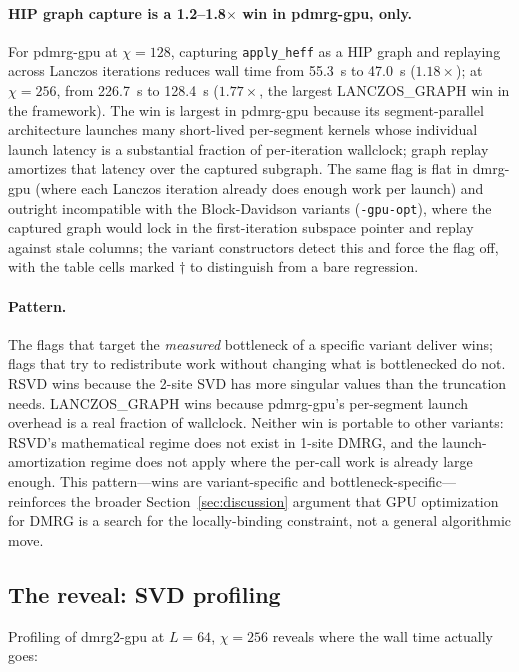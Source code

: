 \documentclass[preprint,12pt]{elsarticle}
\begin{document}
\paragraph{HIP graph capture is a 1.2--1.8$\times$ win in pdmrg-gpu, only.}
For pdmrg-gpu at $\chi = 128$, capturing \texttt{apply\_heff} as a HIP graph and replaying across Lanczos iterations reduces wall time from 55.3~s to 47.0~s ($1.18\times$); at $\chi = 256$, from 226.7~s to 128.4~s ($1.77\times$, the largest LANCZOS\_GRAPH win in the framework).
The win is largest in pdmrg-gpu because its segment-parallel architecture launches many short-lived per-segment kernels whose individual launch latency is a substantial fraction of per-iteration wallclock; graph replay amortizes that latency over the captured subgraph.
The same flag is flat in dmrg-gpu (where each Lanczos iteration already does enough work per launch) and outright incompatible with the Block-Davidson variants (\texttt{-gpu-opt}), where the captured graph would lock in the first-iteration subspace pointer and replay against stale columns; the variant constructors detect this and force the flag off, with the table cells marked $\dagger$ to distinguish from a bare regression.

\paragraph{Pattern.}
The flags that target the \emph{measured} bottleneck of a specific variant deliver wins; flags that try to redistribute work without changing what is bottlenecked do not.
RSVD wins because the 2-site SVD has more singular values than the truncation needs.
LANCZOS\_GRAPH wins because pdmrg-gpu's per-segment launch overhead is a real fraction of wallclock.
Neither win is portable to other variants: RSVD's mathematical regime does not exist in 1-site DMRG, and the launch-amortization regime does not apply where the per-call work is already large enough.
This pattern---wins are variant-specific and bottleneck-specific---reinforces the broader Section~\ref{sec:discussion} argument that GPU optimization for DMRG is a search for the locally-binding constraint, not a general algorithmic move.

\subsection{The reveal: SVD profiling}
\label{sec:svd_bottleneck}

Profiling of dmrg2-gpu at $L = 64$, $\chi = 256$ reveals where the wall time actually goes:
\end{document}

